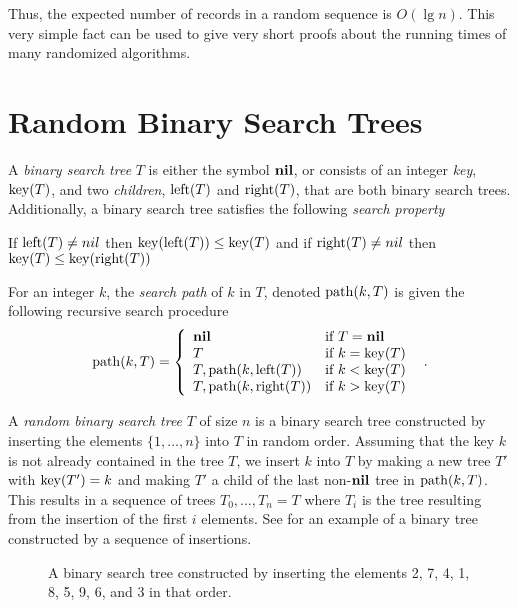 Thus, the expected number of records in a random sequence is $O(\lg
n)$.  This very simple fact can be used to give very short proofs
about the running times of many randomized algorithms.

\section{Random Binary Search Trees}

A \emph{binary search tree} $T$ is either the symbol $\mathbf{nil}$, or
consists of an integer \emph{key}, $\mathrm{key}(T)$, and two \emph{children},
$\mathrm{left}(T)$ and $\mathrm{right}(T)$, that are both binary search trees.
Additionally, a binary search tree satisfies the following
\emph{search property}

\begin{prop}
If $\mathrm{left}(T)\neq nil$ then $\mathrm{key}(\mathrm{left}(T))\le\mathrm{key}(T)$ and 
if $\mathrm{right}(T)\neq nil$ then $\mathrm{key}(T)\le \mathrm{key}(\mathrm{right}(T))$ 
\end{prop}

For an integer $k$, the \emph{search path} of $k$ in $T$, denoted
$\mathrm{path}(k,T)$ is given the following recursive search procedure
\[
\mathrm{path}(k,T) = \left\{ \begin{array}{ll}
		\mathbf{nil} & \mbox{if $T=\mathbf{nil}$} \\
		T & \mbox{if $k=\mathrm{key}(T)$} \\
		T, \mathrm{path}(k,\mathrm{left}(T)) & \mbox{if $k<\mathrm{key}(T)$} \\
		T, \mathrm{path}(k,\mathrm{right}(T)) & \mbox{if $k>\mathrm{key}(T)$}
			\end{array}\right. \enspace .
\]

A \emph{random binary search tree} $T$ of size $n$ is a binary search
tree constructed by inserting the elements $\{1,\ldots,n\}$ into $T$
in random order.  Assuming that the key $k$ is not already contained
in the tree $T$, we insert $k$ into $T$ by making a new tree $T'$ with
$\mathrm{key}(T')=k$ and making $T'$ a child of the last non-$\mathbf{nil}$ tree in
$\mathrm{path}(k,T)$.  This results in a sequence of trees $T_0,\ldots,T_n=T$
where $T_i$ is the tree resulting from the insertion of the first $i$
elements.  See  for an example of a binary tree
constructed by a sequence of insertions.

\begin{figure}
\caption{A binary search tree constructed by inserting the elements
2, 7, 4, 1, 8, 5, 9, 6, and 3 in that order.}
\end{figure}

